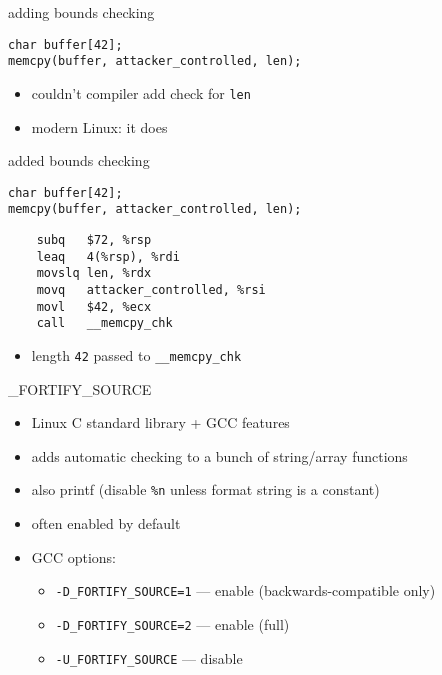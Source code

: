 
\begin{frame}[fragile,label=fortifyMemCpyIntro]{adding bounds checking}
\lstset{language=C,style=small}
\begin{lstlisting}
char buffer[42];
memcpy(buffer, attacker_controlled, len);
\end{lstlisting}
    \begin{itemize}
        \item couldn't compiler add check for \texttt{len}
        \item modern Linux: it does
    \end{itemize}
\end{frame}

\begin{frame}[fragile,label=boundsChecking]{added bounds checking}
\lstset{language=C,style=small}
\begin{lstlisting}
char buffer[42];
memcpy(buffer, attacker_controlled, len);
\end{lstlisting}
\lstset{language=myasm,style=small}
\begin{lstlisting}
    subq   $72, %rsp
    leaq   4(%rsp), %rdi
    movslq len, %rdx
    movq   attacker_controlled, %rsi
    movl   $42, %ecx
    call   __memcpy_chk
\end{lstlisting}
    \begin{itemize}
        \item length \texttt{42} passed to \texttt{\_\_memcpy\_chk}
    \end{itemize}
\end{frame}

\begin{frame}{\_FORTIFY\_SOURCE}
    \begin{itemize}
        \item Linux C standard library + GCC features
        \item adds automatic checking to a bunch of string/array functions
        \item also printf (disable \texttt{\%n} unless format string is a constant)
        \vspace{.5cm}
        \item often enabled by default
        \item GCC options:
            \begin{itemize}
                \item \texttt{-D\_FORTIFY\_SOURCE=1} --- enable (backwards-compatible only)
                \item \texttt{-D\_FORTIFY\_SOURCE=2} --- enable (full)
                \item \texttt{-U\_FORTIFY\_SOURCE} --- disable
            \end{itemize}
    \end{itemize}
\end{frame}


